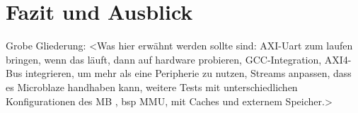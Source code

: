 \chapter{Fazit und Ausblick}
Grobe Gliederung:
<Was hier erwähnt werden sollte sind: AXI-Uart zum laufen bringen, wenn das läuft, dann auf hardware probieren, GCC-Integration, AXI4-Bus integrieren, um mehr als eine Peripherie zu nutzen, \textmu\/Streams anpassen, dass es Microblaze handhaben kann, weitere Tests mit unterschiedlichen Konfigurationen des MB , bsp MMU, mit Caches und externem Speicher.>
